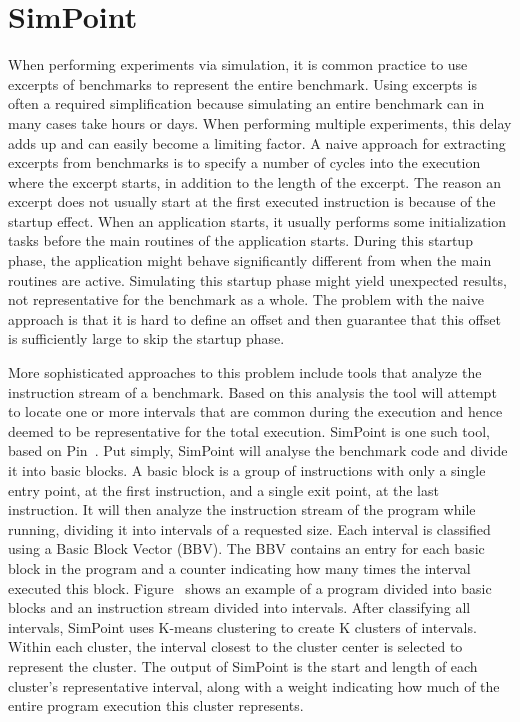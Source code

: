 \section{SimPoint}
\label{sec:background:simpoint}

When performing experiments via simulation, it is common practice to use excerpts of benchmarks to represent the entire benchmark.
Using excerpts is often a required simplification because simulating an entire benchmark can in many cases take hours or days.
When performing multiple experiments, this delay adds up and can easily become a limiting factor.
A naive approach for extracting excerpts from benchmarks is to specify a number of cycles into the execution where the excerpt starts, in addition to the length of the excerpt.
The reason an excerpt does not usually start at the first executed instruction is because of the startup effect.
When an application starts, it usually performs some initialization tasks before the main routines of the application starts.
During this startup phase, the application might behave significantly different from when the main routines are active.
Simulating this startup phase might yield unexpected results, not representative for the benchmark as a whole.
The problem with the naive approach is that it is hard to define an offset and then guarantee that this offset is sufficiently large to skip the startup phase.

More sophisticated approaches to this problem include tools that analyze the instruction stream of a benchmark.
Based on this analysis the tool will attempt to locate one or more intervals that are common during the execution and hence deemed to be representative for the total execution.
SimPoint\cite{Hamerly2005} is one such tool, based on Pin~\cite{Luk2005}.
Put simply, SimPoint will analyse the benchmark code and divide it into basic blocks.
A basic block is a group of instructions with only a single entry point, at the first instruction, and a single exit point, at the last instruction.
It will then analyze the instruction stream of the program while running, dividing it into intervals of a requested size. 
Each interval is classified using a Basic Block Vector (BBV).
The BBV contains an entry for each basic block in the program and a counter indicating how many times the interval executed this block.
Figure~ shows an example of a program divided into basic blocks and an instruction stream divided into intervals.
After classifying all intervals, SimPoint uses K-means clustering to create K clusters of intervals. 
Within each cluster, the interval closest to the cluster center is selected to represent the cluster. 
The output of SimPoint is the start and length of each cluster's representative interval, along with a weight indicating how much of the entire program execution this cluster represents.

